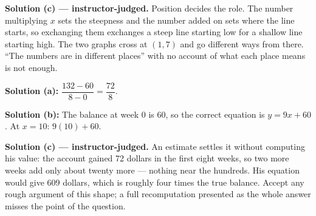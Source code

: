 \documentclass[12pt]{article}
\begin{document}
\textbf{Solution (c) --- instructor-judged.} Position decides the role. The
number multiplying $x$ sets the steepness and the number added on sets where
the line starts, so exchanging them exchanges a steep line starting low for a
shallow line starting high. The two graphs cross at $(1, 7)$ and go different
ways from there. ``The numbers are in different places'' with no account of
what each place means is not enough.


\textbf{Solution (a):} $\dfrac{132 - 60}{8 - 0} = \dfrac{72}{8}$. 

\textbf{Solution (b):} The balance at week 0 is 60, so the correct equation is
$y = 9x + 60$. At $x = 10$: $9(10) + 60$. 

\textbf{Solution (c) --- instructor-judged.} An estimate settles it without
computing his value: the account gained 72 dollars in the first eight weeks,
so two more weeks add only about twenty more --- nothing near the hundreds.
His equation would give 609 dollars, which is roughly four times the true
balance. Accept any rough argument of this shape; a full recomputation
presented as the whole answer misses the point of the question.
\end{document}
